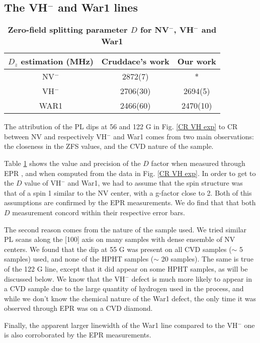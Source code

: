 \documentclass[a4paper,11pt]{report}
\begin{document}
\begin{refsection}
\subsection{The VH$^-$ and War1 lines}
\begin{table}[htbp]
\centering
\caption{\bf Zero-field splitting parameter $D$ for NV$^-$, VH$^-$ and War1}
\begin{tabular}{ccc}
\hline
$D_z$ estimation (MHz) & Cruddace's work\citep{cruddace2007magnetic} & Our work \\
\hline
NV$^-$ & 2872(7) & * \\
VH$^-$ & 2706(30) & 2694(5)  \\
WAR1 & 2466(60) & 2470(10) \\
\hline
\end{tabular}
  \label{table VH et War1}
\end{table}

The attribution of the PL dips at 56 and 122 G in Fig. \ref{CR VH exp} to CR between NV and respectively VH$^-$ and War1 comes from two main observations: the closeness in the ZFS values, and the CVD nature of the sample.

Table \ref{table VH et War1} shows the value and precision of the $D$ factor when measured through EPR \citep{cruddace2007magnetic}, and when computed from the data in Fig. \ref{CR VH exp}. In order to get to the $D$ value of VH$^-$ and War1, we had to assume that the spin structure was that of a spin 1 similar to the NV center, with a g-factor close to 2. Both of this assumptions are confirmed by the EPR measurements. We do find that that both $D$ measurement concord within their respective error bars.

The second reason comes from the nature of the sample used. We tried similar PL scans along the [100] axis on many samples with dense ensemble of NV centers. We found that the dip at 55 G was present on all CVD samples ($\sim$ 5 samples) used, and none of the HPHT samples ($\sim$ 20 samples). The same is true of the 122 G line, except that it did appear on some HPHT samples, as will be discussed below. We know that the VH$^-$ defect is much more likely to appear in a CVD sample due to the large quantity of hydrogen used in the process, and while we don't know the chemical nature of the War1 defect, the only time it was observed through EPR was on a CVD diamond.

Finally, the apparent larger linewidth of the War1 line compared to the VH$^-$ one is also corroborated by the EPR measurements.


\end{refsection}
\end{document}
